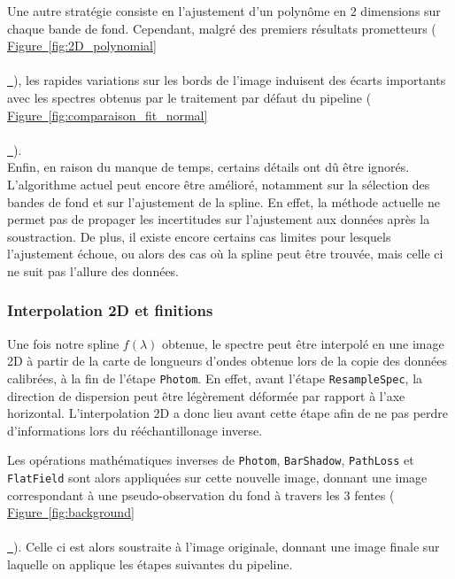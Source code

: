\documentclass[12pt, a4paper]{article}
\newcommand*{\figref}[2][]{%
  \hyperref[{#2}]{%
    Figure~\ref*{#2}%
    \ifx\\#1\\%
    \else
      \,#1%
    \fi
  }%
}
\begin{document}
Une autre stratégie consiste en l'ajustement d'un polynôme en 2 dimensions sur chaque bande de fond. Cependant, malgré des premiers résultats prometteurs (\figref{fig:2D_polynomial}), les rapides variations sur les bords de l'image induisent des écarts importants avec les spectres obtenus par le traitement par défaut du pipeline (\figref{fig:comparaison_fit_normal}).\\

Enfin, en raison du manque de temps, certains détails ont dû être ignorés. L'algorithme actuel peut encore être amélioré, notamment sur la sélection des bandes de fond et sur l'ajustement de la spline. En effet, la méthode actuelle ne permet pas de propager les incertitudes sur l'ajustement aux données après la soustraction. De plus, il existe encore certains cas limites pour lesquels l'ajustement échoue, ou alors des cas où la spline peut être trouvée, mais celle ci ne suit pas l'allure des données.


\subsubsection{Interpolation 2D et finitions}

Une fois notre spline $f(\lambda)$ obtenue, le spectre peut être interpolé en une image 2D à partir de la carte de longueurs d'ondes obtenue lors de la copie des données calibrées, à la fin de l'étape \texttt{Photom}. En effet, avant l'étape \texttt{ResampleSpec}, la direction de dispersion peut être légèrement déformée par rapport à l'axe horizontal. L'interpolation 2D a donc lieu avant cette étape afin de ne pas perdre d'informations lors du rééchantillonage inverse.

Les opérations mathématiques inverses de \texttt{Photom}, \texttt{BarShadow}, \texttt{PathLoss} et \texttt{FlatField} sont alors appliquées sur cette nouvelle image, donnant une image correspondant à une pseudo-observation du fond à travers les 3 fentes (\figref{fig:background}). Celle ci est alors soustraite à l'image originale, donnant une image finale sur laquelle on applique les étapes suivantes du pipeline.
\end{document}
